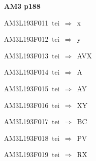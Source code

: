 \par\vfill\eject
{\bf\hfill AM3 p188\hfill\hbox{}}\par\bigskip
{\sixrm AM3L193F011\ {\sixit tei}\ }$\Rightarrow$\ {\tenit x}\par\smallskip
{\sixrm AM3L193F012\ {\sixit tei}\ }$\Rightarrow$\ {\tenit y}\par\smallskip
{\sixrm AM3L193F013\ {\sixit tei}\ }$\Rightarrow$\ AVX\par\smallskip
{\sixrm AM3L193F014\ {\sixit tei}\ }$\Rightarrow$\ A\par\smallskip
{\sixrm AM3L193F015\ {\sixit tei}\ }$\Rightarrow$\ AY\par\smallskip
{\sixrm AM3L193F016\ {\sixit tei}\ }$\Rightarrow$\ XY\par\smallskip
{\sixrm AM3L193F017\ {\sixit tei}\ }$\Rightarrow$\ BC\par\smallskip
{\sixrm AM3L193F018\ {\sixit tei}\ }$\Rightarrow$\ PV\par\smallskip
{\sixrm AM3L193F019\ {\sixit tei}\ }$\Rightarrow$\ RX\par\smallskip

